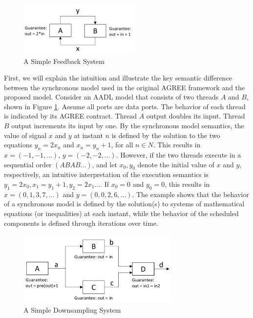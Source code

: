 \begin{figure}[ht!]
\centering
\includegraphics[width=60mm]{simpleFeedback.jpg}
\caption{A Simple Feedback System\label{motivationFig1}}
\end{figure}

First, we will explain the intuition and illustrate the key semantic difference between the synchronous model used in the original AGREE framework and the proposed model.
Consider an AADL model that consists of two threads $A$ and $B$, shown in Figure \ref{motivationFig1}. Assume all ports are data ports. The behavior of each thread is indicated by its AGREE contract. Thread $A$ output doubles its input. Thread $B$ output increments its input by one. By the synchronous model semantics, the value of signal $x$ and $y$ at instant $n$ is defined by the solution to the two equations $y_n = 2x_n$ and $x_n = y_n+1$, for all $n \in N$. This results in $x = (-1, -1, …)$, $y = (-2, -2, …)$. However, if the two threads execute in a sequential order $(ABAB...)$, and let $x_0, y_0$ denote the initial value of $x$ and $y$, respectively, an intuitive interpretation of the execution semantics is $y_1 = 2x_0, x_1 = y_1+1, y_2 = 2x_1...$. If $x_0 = 0$ and  $y_0 = 0$, this results in $x = (0, 1, 3, 7,…)$ and $y = (0, 0, 2, 6, …)$. The example shows that the behavior of a synchronous model is defined by the solution(s) to systems of mathematical equations (or inequalities) at each instant, while the behavior of the scheduled components is defined through iterations over time. 

\begin{figure}[ht!]
\centering
\includegraphics[width=80mm]{downsample.jpg}
\caption{A Simple Downsampling System\label{motivationFig2}}
\end{figure}

